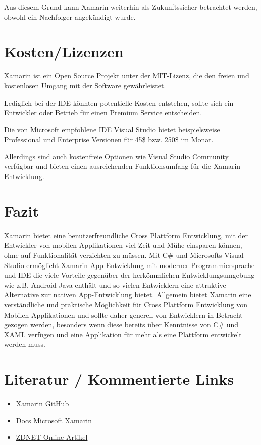 \documentclass[12pt]{article}
\begin{document}
Aus diesem Grund kann Xamarin weiterhin als Zukunftssicher betrachtet werden, obwohl ein Nachfolger angekündigt wurde.

\section{Kosten/Lizenzen}
Xamarin ist ein Open Source Projekt unter der MIT-Lizenz, die den freien und kostenlosen Umgang mit der Software gewährleistet.

Lediglich bei der IDE könnten potentielle Kosten entstehen, sollte sich ein Entwickler oder Betrieb für einen Premium Service entscheiden.

Die von Microsoft empfohlene IDE Visual Studio bietet beispielsweise Professional und Enterprise Versionen für 45\$ bzw. 250\$ im Monat.

Allerdings sind auch kostenfreie Optionen wie Visual Studio Community verfügbar und bieten einen ausreichenden Funktionsumfang für die Xamarin Entwicklung.


\section{Fazit}
Xamarin bietet eine benutzerfreundliche Cross Plattform Entwicklung, mit der Entwickler von mobilen Applikationen viel Zeit und Mühe einsparen können, ohne auf Funktionalität verzichten zu müssen.
Mit C\# und Microsofts Visual Studio ermöglicht Xamarin App Entwicklung mit moderner Programmiersprache und IDE die viele Vorteile gegenüber der herkömmlichen Entwicklungsumgebung wie z.B. Android Java enthält und so vielen Entwicklern eine attraktive Alternative zur nativen App-Entwicklung bietet.
Allgemein bietet Xamarin eine verständliche und praktische Möglichkeit für Cross Plattform Entwicklung von Mobilen Applikationen und sollte daher generell von Entwicklern in Betracht gezogen werden, besonders wenn diese bereits über Kenntnisse von C\# und XAML verfügen und eine Applikation für mehr als eine Plattform entwickelt werden muss.



\section{Literatur / Kommentierte Links}

\begin{itemize}
 \item \href{https://github.com/xamarin}{Xamarin GitHub}
 \item \href{https://docs.microsoft.com/de-de/xamarin/}{Docs Microsoft Xamarin}
 \item \href{https://www.zdnet.de/88267682/microsoft-macht-xamarin-sdk-unter-freier-mit-lizenz-verfuegbar/}{ZDNET Online Artikel}
\end{itemize}
\end{document}
